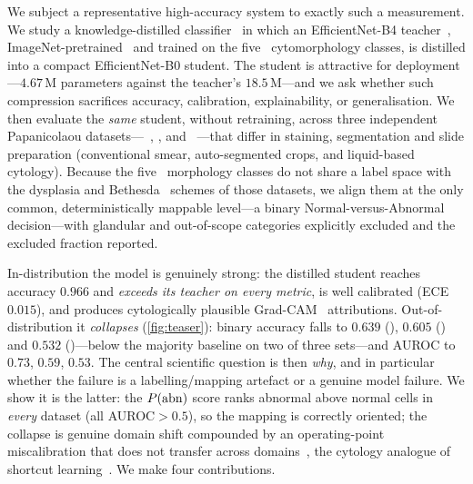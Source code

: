 We subject a representative high-accuracy system to exactly such a measurement. We study a
knowledge-distilled classifier~\cite{hinton2015distilling} in which an EfficientNet-B4
teacher~\cite{tan2019efficientnet}, ImageNet-pretrained~\cite{deng2009imagenet} and trained on the
five \sipakmed\ cytomorphology classes, is distilled into a compact EfficientNet-B0 student. The
student is attractive for deployment---$4.67$\,M parameters against the teacher's $18.5$\,M---and we
ask whether such compression sacrifices accuracy, calibration, explainability, or generalisation. We
then evaluate the \emph{same} student, without retraining, across three independent Papanicolaou
datasets---\herlev~\cite{jantzen2005herlev}, \apacc, and \hicervix~\cite{cai2024hicervix}---that
differ in staining, segmentation and slide preparation (conventional smear, auto-segmented crops, and
liquid-based cytology). Because the five \sipakmed\ morphology classes do not share a label space
with the dysplasia and Bethesda~\cite{nayar2015bethesda} schemes of those datasets, we align them at
the only common, deterministically mappable level---a binary Normal-versus-Abnormal decision---with
glandular and out-of-scope categories explicitly excluded and the excluded fraction reported.

In-distribution the model is genuinely strong: the distilled student reaches accuracy $0.966$ and
\emph{exceeds its teacher on every metric}, is well calibrated (ECE\,$0.015$), and produces
cytologically plausible Grad-CAM~\cite{selvaraju2017gradcam} attributions. Out-of-distribution it
\emph{collapses} (\cref{fig:teaser}): binary accuracy falls to $0.639$ (\herlev), $0.605$ (\hicervix)
and $0.532$ (\apacc)---below the majority baseline on two of three sets---and AUROC to $0.73$, $0.59$,
$0.53$. The central scientific question is then \emph{why}, and in particular whether the failure is
a labelling/mapping artefact or a genuine model failure. We show it is the latter: the $P(\mathrm{abn})$ score
ranks abnormal above normal cells in \emph{every} dataset (all AUROC$>0.5$), so the mapping is
correctly oriented; the collapse is genuine domain shift compounded by an operating-point
miscalibration that does not transfer across domains~\cite{guo2017calibration}, the cytology analogue
of shortcut learning~\cite{geirhos2020shortcut}. We make four contributions.

